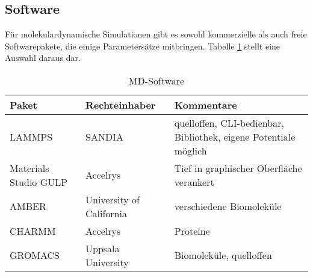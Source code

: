 \subsection{Software}

Für molekulardynamische Simulationen gibt es sowohl kommerzielle als auch freie Softwarepakete, die einige Parametersätze mitbringen.
Tabelle \ref{tab:mdsoftware} stellt eine Auswahl daraus dar.

\begin{table}
  \oddrowcolors
  \caption[MD-Software]{MD-Software}
  \label{tab:mdsoftware}
  \begin{tabularx}{\textwidth}{|llX|}
    \hline
    \textbf{Paket} & \textbf{Rechteinhaber} & \textbf{Kommentare} \\
    \hline
    LAMMPS & SANDIA & quelloffen, CLI-bedienbar, Bibliothek, eigene Potentiale möglich \\
    Materials Studio GULP & Accelrys & Tief in graphischer Oberfläche verankert \\
    AMBER & University of California & verschiedene Biomoleküle \\
    CHARMM & Accelrys & Proteine \\
    GROMACS & Uppsala University & Biomoleküle, quelloffen \\
    \hline
  \end{tabularx}
\end{table}

